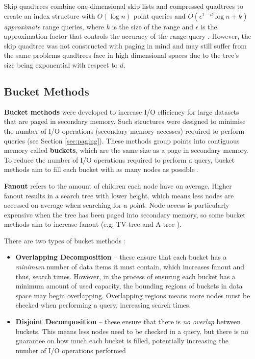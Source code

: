 Skip quadtrees combine one-dimensional skip lists \cite{skip-quadtree} and compressed quadtrees to create an index structure with $O(\log n)$ point queries and $O(\epsilon^{1 - d} \log n + k)$ \textit{approximate} range queries, where $k$ is the size of the range and $\epsilon$ is the approximation factor that controls the accuracy of the range query \cite{skip-quadtree}. However, the skip quadtree was not constructed with paging in mind and may still suffer from the same problems quadtrees face in high dimensional spaces due to the tree's size being exponential with respect to $d$.


\subsection{Bucket Methods}
\label{sec:bucket-methods}

\textbf{Bucket methods} were developed to increase I/O efficiency for large datasets that are paged in secondary memory. Such structures were designed to minimise the number of I/O operations (secondary memory accesses) required to perform queries (see Section \ref{sec:paging}). These methods group points into contiguous memory called \textbf{buckets}, which are the same size as a page in secondary memory. To reduce the number of I/O operations required to perform a query, bucket methods aim to fill each bucket with as many nodes as possible \cite{md-structures-samet}.

\textbf{Fanout} refers to the amount of children each node have on average. Higher fanout results in a search tree with lower height, which means less nodes are accessed on average when searching for a point. Node access is particularly expensive when the tree has been paged into secondary memory, so some bucket methods aim to increase fanout (e.g. TV-tree \cite{tv-tree} and A-tree \cite{a-tree}).

There are two types of bucket methods \cite{md-structures-samet}:
\begin{itemize}
	\item \textbf{Overlapping Decomposition} -- these ensure that each bucket has a \textit{minimum} number of data items it must contain, which increases fanout and thus, search times. However, in the process of ensuring each bucket has a minimum amount of used capacity, the bounding regions of buckets in data space may begin overlapping. Overlapping regions means more nodes must be checked when performing a query, increasing search times.
	\item \textbf{Disjoint Decomposition} -- these ensure that there is \textit{no overlap} between buckets. This means less nodes need to be checked in a query, but there is no guarantee on how much each bucket is filled, potentially increasing the number of I/O operations performed
\end{itemize}

